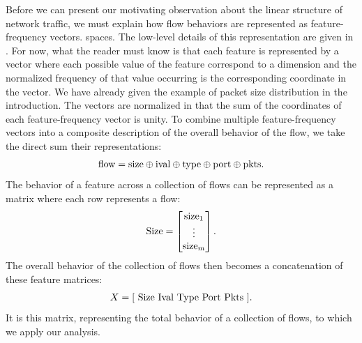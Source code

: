 \documentclass[conference]{IEEEtran}
\begin{document}

Before we can present our motivating observation about the linear structure of network traffic, we must explain how flow behaviors are represented as feature-frequency vectors. spaces.
The low-level details of this representation are given in .
For now, what the reader must know is that each feature is represented by a vector where each possible value of the feature correspond to a dimension and the normalized frequency of that value occurring is the corresponding coordinate in the vector.
We have already given the example of packet size distribution in the introduction.
The vectors are normalized in that the sum of the coordinates of each feature-frequency vector is unity.
To combine multiple feature-frequency vectors into a composite description of the overall behavior of the flow, we take the direct sum their representations:\directsumnote
\begin{align}\eqn{flow}
  \text{flow} =
  \text{size} \directsum
  \text{ival} \directsum
  \text{type} \directsum
  \text{port} \directsum
  \text{pkts}.
\end{align}
The behavior of a feature across a collection of flows can be represented as a matrix where each row represents a flow:
\begin{align}\eqn{Size}
  \text{Size} = \begin{bmatrix}
    \text{size}_1 \\
    \vdots \\
    \text{size}_m
  \end{bmatrix}.
\end{align}
The overall behavior of the collection of flows then becomes a concatenation of these feature matrices:
\begin{align}\eqn{X}
  X = \bracket{ ~
    \text{Size} ~
    \text{Ival} ~
    \text{Type} ~
    \text{Port} ~
    \text{Pkts} ~
  }.
\end{align}
It is this matrix, representing the total behavior of a collection of flows, to which we apply our analysis.


\end{document}
